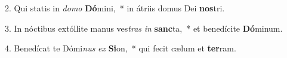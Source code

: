 2. Qui statis in \textit{do}\textit{mo} \textbf{Dó}mini,~*  in átriis domus Dei \textbf{nos}tri.\

3. In nóctibus extóllite manus ves\textit{tras} \textit{in} \textbf{sanc}ta,~*  et benedícite \textbf{Dó}minum.\

4. Benedícat te Dómi\textit{nus} \textit{ex} \textbf{Si}on,~*  qui fecit cælum et \textbf{ter}ram.\

